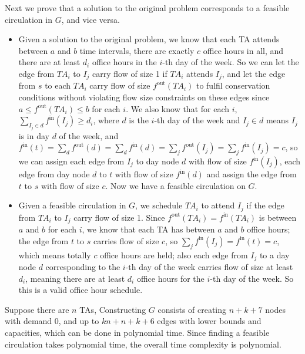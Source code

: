 \documentclass[12pt,letterpaper]{article}
\begin{document}
Next we prove that a solution to the original problem corresponds to a feasible circulation in $G$, and vice versa.
\begin{itemize}
\item Given a solution to the original problem, we know that each TA attends between $a$ and $b$ time intervals, there are exactly $c$ office hours in all, and there are at least $d_i$ office hours in the $i$-th day of the week. So we can let the edge from $TA_i$ to $I_j$ carry flow of size 1 if $TA_i$ attends $I_j$, and let the edge from $s$ to each $TA_i$ carry flow of size $f^{\textrm{out}}(TA_i)$ to fulfil conservation conditions without violating flow size constraints on these edges since $a\le f^{\textrm{out}}(TA_i)\le b$ for each $i$. We also know that for each $i$, $\sum_{I_j\in d}f^{\textrm{in}}(I_j)\ge d_i$, where $d$ is the $i$-th day of the week and $I_j\in d$ means $I_j$ is in day $d$ of the week, and $f^{\textrm{in}}(t)=\sum_{d}f^{\textrm{out}}(d)=\sum_{d}f^{\textrm{in}}(d)=\sum_{j}f^{\textrm{out}}(I_j)=\sum_{j}f^{\textrm{in}}(I_j)=c$, so we can assign each edge from $I_j$ to day node $d$ with flow of size $f^{\textrm{in}}(I_j)$, each edge from day node $d$ to $t$ with flow of size $f^{\textrm{in}}(d)$ and assign the edge from $t$ to $s$ with flow of size $c$. Now we have a feasible circulation on $G$.
\item Given a feasible circulation in $G$, we schedule $TA_i$ to attend $I_j$ if the edge from $TA_i$ to $I_j$ carry flow of size 1. Since $f^{\textrm{out}}(TA_i)=f^{\textrm{in}}(TA_i)$ is between $a$ and $b$ for each $i$, we know that each TA has between $a$ and $b$ office hours; the edge from $t$ to $s$ carries flow of size $c$, so $\sum_{j}f^{\textrm{in}}(I_j)=f^{\textrm{in}}(t)=c$, which means totally $c$ office hours are held; also each edge from $I_j$ to a day node $d$ corresponding to the $i$-th day of the week carries flow of size at least $d_i$, meaning there are at least $d_i$ office hours for the $i$-th day of the week. So this is a valid office hour schedule.
\end{itemize}

Suppose there are $n$ TAs, Constructing $G$ consists of creating $n+k+7$ nodes with demand 0, and up to $kn+n+k+6$ edges with lower bounds and capacities, which can be done in polynomial time. Since finding a feasible circulation takes polynomial time, the overall time complexity is polynomial.
\end{document}
